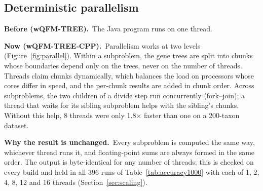\documentclass[11pt,a4paper]{article}
\newcommand{\wqfmtree}{wQFM-TREE}
\newcommand{\cpp}{wQFM-TREE-CPP}
\newcommand{\Before}{\par\smallskip\noindent\textbf{\textcolor{beforec}{Before (\wqfmtree).}}\ }
\newcommand{\Now}{\par\smallskip\noindent\textbf{\textcolor{nowc}{Now (\cpp).}}\ }
\newcommand{\Exact}{\par\smallskip\noindent\textbf{Why the result is unchanged.}\ }
\begin{document}
\subsection{Deterministic parallelism}\label{sec:parallel}

\Before The Java program runs on one thread.

\Now Parallelism works at two levels (Figure~\ref{fig:parallel}). Within a subproblem, the gene
trees are split into chunks whose boundaries depend only on the trees, never on the number of
threads. Threads claim chunks dynamically, which balances the load on processors whose cores differ in
speed, and the per-chunk results are added in chunk order. Across subproblems, the two children of a
divide step run concurrently (fork--join); a thread that waits for its sibling subproblem helps with
the sibling's chunks. Without this help, 8 threads were only 1.8$\times$ faster than one on a 200-taxon
dataset.

\Exact Every subproblem is computed the same way, whichever thread runs it, and floating-point
sums are always formed in the same order. The output is byte-identical for any number of threads; this
is checked on every build and held in all 396 runs of Table~\ref{tab:accuracy1000} with each of 1, 2,
4, 8, 12 and 16 threads (Section~\ref{sec:scaling}).
\end{document}

